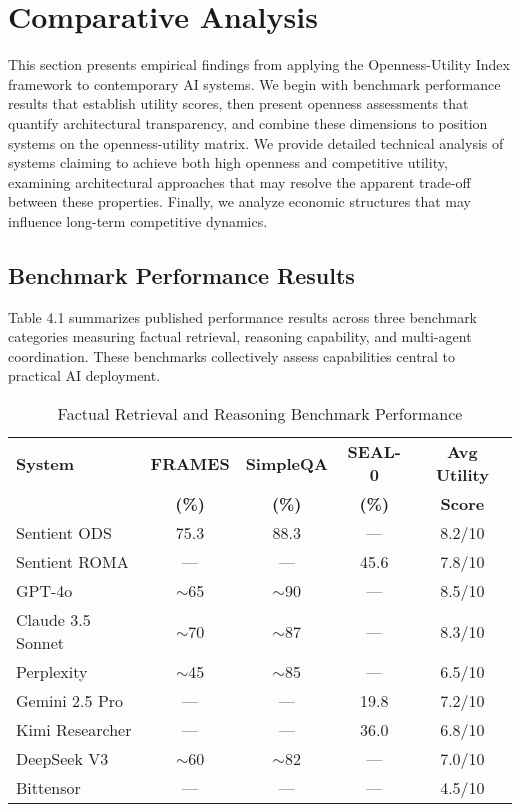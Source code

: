 
\section{Comparative Analysis}

This section presents empirical findings from applying the Openness-Utility Index framework to contemporary AI systems. We begin with benchmark performance results that establish utility scores, then present openness assessments that quantify architectural transparency, and combine these dimensions to position systems on the openness-utility matrix. We provide detailed technical analysis of systems claiming to achieve both high openness and competitive utility, examining architectural approaches that may resolve the apparent trade-off between these properties. Finally, we analyze economic structures that may influence long-term competitive dynamics.

\subsection{Benchmark Performance Results}

Table 4.1 summarizes published performance results across three benchmark categories measuring factual retrieval, reasoning capability, and multi-agent coordination. These benchmarks collectively assess capabilities central to practical AI deployment.

\begin{table}[h]
\centering
\caption{Factual Retrieval and Reasoning Benchmark Performance}
\begin{tabular}{lcccc}
\toprule
\textbf{System} & \textbf{FRAMES} & \textbf{SimpleQA} & \textbf{SEAL-0} & \textbf{Avg Utility} \\
                & \textbf{(\%)}   & \textbf{(\%)}     & \textbf{(\%)}   & \textbf{Score} \\
\midrule
Sentient ODS         & 75.3 & 88.3 & ---  & 8.2/10 \\
Sentient ROMA        & ---  & ---  & 45.6 & 7.8/10 \\
GPT-4o               & $\sim$65 & $\sim$90 & ---  & 8.5/10 \\
Claude 3.5 Sonnet    & $\sim$70 & $\sim$87 & ---  & 8.3/10 \\
Perplexity           & $\sim$45 & $\sim$85 & ---  & 6.5/10 \\
Gemini 2.5 Pro       & ---  & ---  & 19.8 & 7.2/10 \\
Kimi Researcher      & ---  & ---  & 36.0 & 6.8/10 \\
DeepSeek V3          & $\sim$60 & $\sim$82 & ---  & 7.0/10 \\
Bittensor            & ---  & ---  & ---  & 4.5/10 \\
\bottomrule
\end{tabular}
\label{tab:benchmark_performance}
\end{table}

